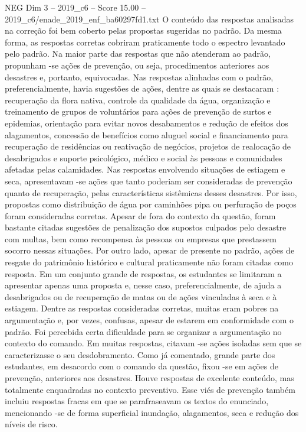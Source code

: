 \begin{textsample}{NEG Dim 3 – 2019\_c6 – Score 15.00 – 2019\_c6/enade\_2019\_enf\_ba60297fd1.txt}
O conteúdo das respostas analisadas na correção foi bem coberto pelas propostas sugeridas no padrão.
Da mesma forma, as respostas corretas cobriram praticamente todo o espectro levantado pelo padrão.
Na maior parte das respostas que não atenderam ao padrão, propunham -se ações de prevenção, ou seja, procedimentos anteriores aos desastres e, portanto, equivocadas.
Nas respostas alinhadas com o padrão, preferencialmente, havia sugestões de ações, dentre as quais se destacaram : recuperação da flora nativa, controle da qualidade da água, organização e treinamento de grupos de voluntários para ações de prevenção de surtos e epidemias, orientação para evitar novos desabamentos e redução de efeitos dos alagamentos, concessão de benefícios como aluguel social e financiamento para recuperação de residências ou reativação de negócios, projetos de realocação de desabrigados e suporte psicológico, médico e social às pessoas e comunidades afetadas pelas calamidades.
Nas respostas envolvendo situações de estiagem e seca, apresentavam -se ações que tanto poderiam ser consideradas de prevenção quanto de recuperação, pelas características sistêmicas desses desastres.
Por isso, propostas como distribuição de água por caminhões pipa ou perfuração de poços foram consideradas corretas.
Apesar de fora do contexto da questão, foram bastante citadas sugestões de penalização dos supostos culpados pelo desastre com multas, bem como recompensa às pessoas ou empresas que prestassem socorro nessas situações.
Por outro lado, apesar de presente no padrão, ações de resgate do patrimônio histórico e cultural praticamente não foram citadas como resposta.
Em um conjunto grande de respostas, os estudantes se limitaram a apresentar apenas uma proposta e, nesse caso, preferencialmente, de ajuda a desabrigados ou de recuperação de matas ou de ações vinculadas à seca e à estiagem.
Dentre as respostas consideradas corretas, muitas eram pobres na argumentação e, por vezes, confusas, apesar de estarem em conformidade com o padrão.
Foi percebida certa dificuldade para se organizar a argumentação no contexto do comando.
Em muitas respostas, citavam -se ações isoladas sem que se caracterizasse o seu desdobramento.
Como já comentado, grande parte dos estudantes, em desacordo com o comando da questão, fixou -se em ações de prevenção, anteriores aos desastres.
Houve respostas de excelente conteúdo, mas totalmente enquadradas no contexto preventivo.
Esse viés de prevenção também incluiu respostas fracas em que se parafraseavam os textos do enunciado, mencionando -se de forma superficial inundação, alagamentos, seca e redução dos níveis de risco.

\end{textsample}
